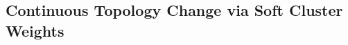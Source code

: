 \documentclass[letterpaper, 10 pt, conference]{ieeeconf}  %
\theoremstyle{tight}
\begin{document}






\subsection{Continuous Topology Change via Soft Cluster Weights}
\label{sec:pf-cutting}
\end{document}
